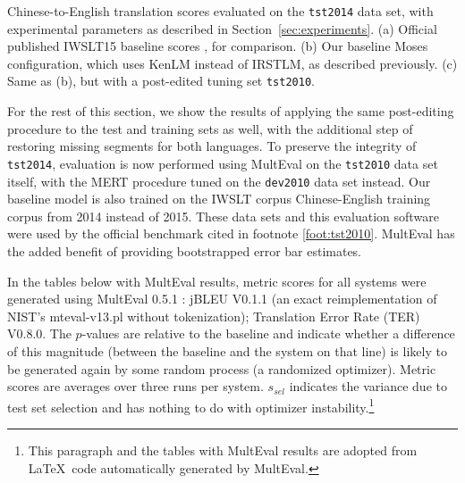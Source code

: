 {\begin{table}[ht]
\caption{ \label{tab:tst2010}
    Chinese-to-English translation scores evaluated on the {\small \tt tst2014} data set, with experimental parameters as described in Section~\ref{sec:experiments}. 
    (a) Official published IWSLT15 baseline scores , for comparison.
    (b) Our baseline Moses configuration, which uses KenLM instead of IRSTLM, as described previously.
    (c) Same as (b), but with a post-edited tuning set {\small \tt tst2010}. 
} %
\end{table}

For the rest of this section, we show the results of applying the same post-editing procedure to the test and training sets as well, with the additional step of restoring missing segments for both languages. 
To preserve the integrity of {\small \tt tst2014}, evaluation is now performed using MultEval  on the {\small \tt tst2010} data set itself, with the MERT procedure tuned on the {\small \tt dev2010} data set instead.
Our baseline model is also trained on the IWSLT corpus Chinese-English training corpus from 2014 instead of 2015.
These data sets and this evaluation software were used by the official benchmark cited in footnote \ref{foot:tst2010}.
MultEval has the added benefit of providing bootstrapped error bar estimates.



In the tables below with MultEval results, metric scores for all systems were generated using MultEval 0.5.1 : jBLEU V0.1.1 (an exact reimplementation of NIST's mteval-v13.pl without tokenization); Translation Error Rate (TER) V0.8.0. 
The $p$-values are relative to the baseline and indicate whether a difference of this magnitude (between the baseline and the system on that line) is likely to be generated again by some random process (a randomized optimizer). 
Metric scores are averages over three runs per system. 
$s_{sel}$ indicates the variance due to test set selection and has nothing to do with optimizer instability.\footnote{
    This paragraph and the tables with MultEval results are adopted from \LaTeX~code automatically generated by MultEval.
}


}
